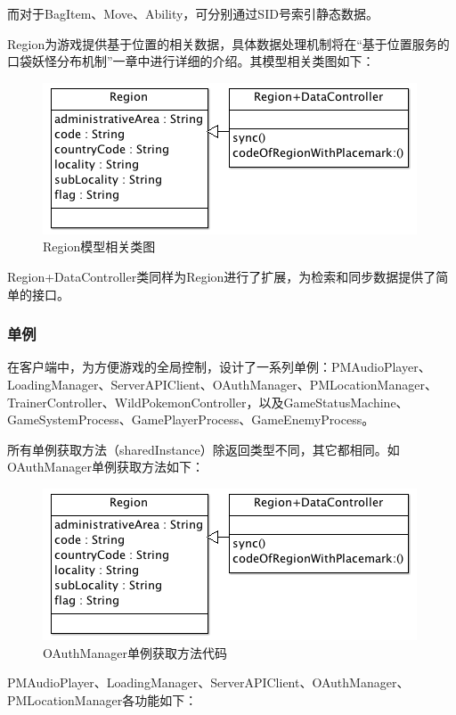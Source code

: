 \documentclass{article}
\begin{document}
\begin{CJK}{UTF8}{gbsn}
  而对于BagItem、Move、Ability，可分别通过SID号索引静态数据。

  Region为游戏提供基于位置的相关数据，具体数据处理机制将在“基于位置服务的口袋妖怪分布机制”一章中进行详细的介绍。其模型相关类图如下：

  \begin{figure}[htbp]
		\centering
		\includegraphics[bb=0 0 420 175, scale=0.45]{figure/fig_n16.png}
		\caption{Region模型相关类图}
		\label{fig:n16}
	\end{figure}

  Region+DataController类同样为Region进行了扩展，为检索和同步数据提供了简单的接口。

	\subsubsection{单例}
  在客户端中，为方便游戏的全局控制，设计了一系列单例：PMAudioPlayer、LoadingManager、ServerAPIClient、OAuthManager、PMLocationManager、TrainerController、WildPokemonController，以及GameStatusMachine、GameSystemProcess、GamePlayerProcess、GameEnemyProcess。

  所有单例获取方法（sharedInstance）除返回类型不同，其它都相同。如OAuthManager单例获取方法如下：
  \begin{figure}[htbp]
		\centering
		\includegraphics[bb=0 0 420 175, scale=0.45]{figure/fig_n16.png}
		\caption{OAuthManager单例获取方法代码}
		\label{fig:n16}
	\end{figure}

  PMAudioPlayer、LoadingManager、ServerAPIClient、OAuthManager、PMLocationManager各功能如下：


\end{CJK}
\end{document}
